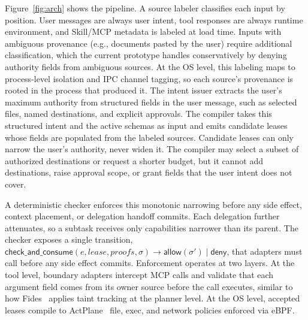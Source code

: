 \documentclass[sigconf,nonacm]{acmart}
\begin{document}
Figure~\ref{fig:arch} shows the pipeline.
A source labeler classifies each input by position.
User messages are always user intent, tool responses are always runtime environment, and Skill/MCP metadata is labeled at load time.
Inputs with ambiguous provenance (e.g., documents pasted by the user) require additional classification, which the current prototype handles conservatively by denying authority fields from ambiguous sources.
At the OS level, this labeling maps to process-level isolation and IPC channel tagging, so each source's provenance is rooted in the process that produced it.
The intent issuer extracts the user's maximum authority from structured fields in the user message, such as selected files, named destinations, and explicit approvals.
The compiler takes this structured intent and the active schemas as input and emits candidate leases whose fields are populated from the labeled sources.
Candidate leases can only narrow the user's authority, never widen it.
The compiler may select a subset of authorized destinations or request a shorter budget, but it cannot add destinations, raise approval scope, or grant fields that the user intent does not cover.


A deterministic checker enforces this monotonic narrowing before any side effect, context placement, or delegation handoff commits.
Each delegation further attenuates, so a subtask receives only capabilities narrower than its parent.
The checker exposes a single transition, $\mathsf{check\_and\_consume}(e,\mathit{lease},\mathit{proofs},\sigma) \rightarrow \mathsf{allow}(\sigma') \mid \mathsf{deny}$, that adapters must call before any side effect commits.
Enforcement operates at two layers. At the tool level, boundary adapters intercept MCP calls and validate that each argument field comes from its owner source before the call executes, similar to how Fides~\cite{fides} applies taint tracking at the planner level. At the OS level, accepted leases compile to ActPlane~\cite{actplane} file, exec, and network policies enforced via eBPF.
\end{document}
